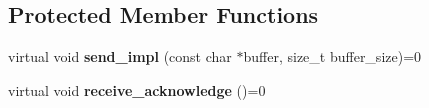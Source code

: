 \subsection*{Protected Member Functions}
\begin{DoxyCompactItemize}
\item 
\mbox{\label{classcomm_1_1buffer__transport_a7c4d1651a8af5965619c9e37b225859d}} 
virtual void {\bfseries send\+\_\+impl} (const char $\ast$buffer, size\+\_\+t buffer\+\_\+size)=0
\item 
\mbox{\label{classcomm_1_1buffer__transport_a6aa1fb3a4543ace7e5c06914252a02e4}} 
virtual void {\bfseries receive\+\_\+acknowledge} ()=0
\end{DoxyCompactItemize}

